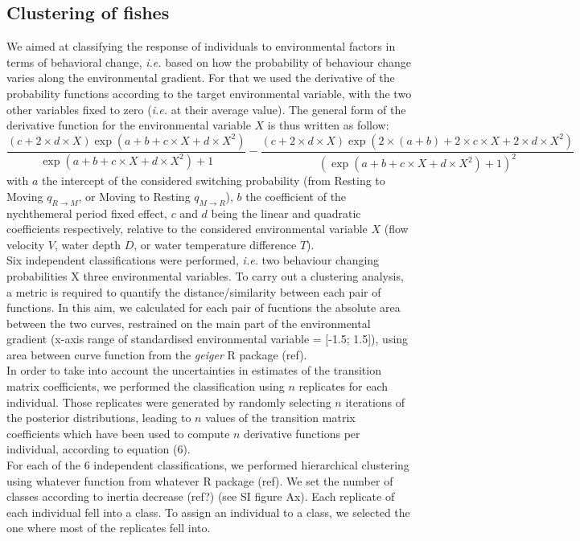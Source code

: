 \documentclass{article}
\begin{document}
\begin{linenumbers}
\subsection{Clustering of fishes}
We aimed at classifying the response of individuals to environmental factors in terms of behavioral change, \textit{i.e.} based on how the probability of behaviour change varies along the environmental gradient. For that we used the derivative of the probability functions according to the target environmental variable, with the two other variables fixed to zero (\textit{i.e.} at their average value). The general form of the derivative function for the environmental variable $X$ is thus written as follow:
\begin{equation}
\frac{(c + 2\times d\times X)\exp(a + b + c\times X + d\times X^2)}{\exp(a + b + c\times X + d\times X^2) + 1} -
\frac{(c + 2\times d\times X)\exp(2\times (a + b) + 2\times c\times X + 2\times d\times X^2)}{(\exp(a + b + c\times X + d\times X^2) + 1)^2}
\end{equation}
with $a$ the intercept of the considered switching probability (from Resting to Moving $q_{R \rightarrow M}$, or Moving to Resting $q_{M \rightarrow R}$), $b$ the coefficient of the nychthemeral period fixed effect, $c$ and $d$ being the linear and quadratic coefficients respectively, relative to the considered environmental variable $X$ (flow velocity $V$, water depth $D$, or water temperature difference $T$).\\
Six independent classifications were performed, \textit{i.e.} two behaviour changing probabilities X three environmental variables. To carry out a clustering analysis, a metric is required to quantify the distance/similarity between each pair of functions. In this aim, we calculated for each pair of fucntions the absolute area between the two curves, restrained on the main part of the environmental gradient (x-axis range of standardised environmental variable = [-1.5; 1.5]), using area between curve function from the \textit{geiger} R package (ref).\\
In order to take into account the uncertainties in estimates of the transition matrix coefficients, we performed the classification using $n$ replicates for each individual. Those replicates were generated by randomly selecting $n$ iterations of the posterior distributions, leading to $n$ values of the transition matrix coefficients which have been used to compute $n$ derivative functions per individual, according to equation (6).\\
For each of the 6 independent classifications, we performed hierarchical clustering using whatever function from whatever R package (ref). We set the number of classes according to inertia decrease (ref?) (see SI figure Ax). Each replicate of each individual fell into a class. To assign an individual to a class, we selected the one where most of the replicates fell into.



\end{linenumbers}
\end{document}
